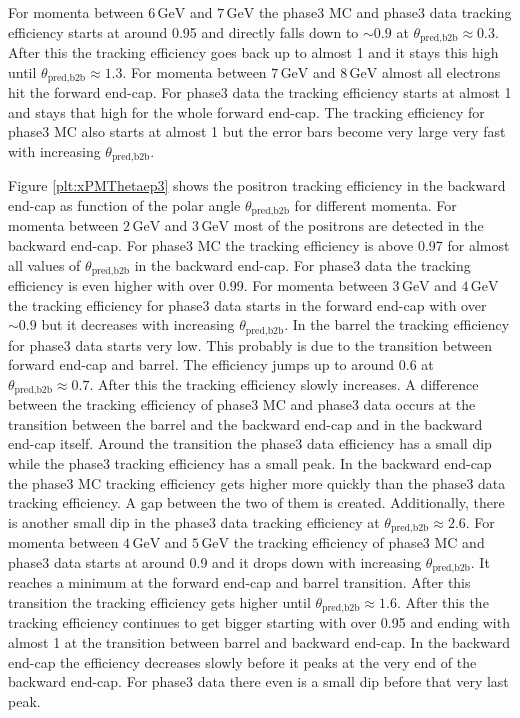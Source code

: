 \documentclass[a4paper,11pt,twosided,final,german,openbib,pdftex,listof=totoc,bibliography=totoc]{scrbook}
\begin{document}
For momenta between $6\,\textrm{GeV}$ and $7\,\textrm{GeV}$ the phase3 MC and phase3 data tracking efficiency starts at around 0.95 and directly falls down to $\sim 0.9$ at $\theta_{\textrm{pred,b2b}} \approx 0.3$. After this the tracking efficiency goes back up to almost 1 and it stays this high until $\theta_{\textrm{pred,b2b}} \approx 1.3$.
For momenta between $7\,\textrm{GeV}$ and $8\,\textrm{GeV}$ almost all electrons hit the forward end-cap. For phase3 data the tracking efficiency starts at almost 1 and stays that high for the whole forward end-cap. The tracking efficiency for phase3 MC also starts at almost 1 but the error bars become very large very fast with increasing $\theta_{\textrm{pred,b2b}}$.

Figure \ref{plt:xPMThetaep3} shows the positron tracking efficiency in the backward end-cap as function of the polar angle $\theta_{\textrm{pred,b2b}}$ for different momenta.
For momenta between $2\,\textrm{GeV}$ and $3\,\textrm{GeV}$ most of the positrons are detected in the backward end-cap. For phase3 MC the tracking efficiency is above 0.97 for almost all values of $\theta_{\textrm{pred,b2b}}$ in the backward end-cap. For phase3 data the tracking efficiency is even higher with over 0.99.
For momenta between $3\,\textrm{GeV}$ and $4\,\textrm{GeV}$ the tracking efficiency for phase3 data starts in the forward end-cap with over $\sim 0.9$ but it decreases with increasing $\theta_{\textrm{pred,b2b}}$. In the barrel the tracking efficiency for phase3 data starts very low. This probably is due to the transition between forward end-cap and barrel. The efficiency jumps up to around 0.6 at $\theta_{\textrm{pred,b2b}} \approx 0.7$. After this the tracking efficiency slowly increases. A difference between the tracking efficiency of phase3 MC and phase3 data occurs at the transition between the barrel and the backward end-cap and in the backward end-cap itself. Around the transition the phase3 data efficiency has a small dip while the phase3 tracking efficiency has a small peak. In the backward end-cap the phase3 MC tracking efficiency gets higher more quickly than the phase3 data tracking efficiency. A gap between the two of them is created. Additionally, there is another small dip in the phase3 data tracking efficiency at $\theta_{\textrm{pred,b2b}} \approx 2.6$. 
For momenta between $4\,\textrm{GeV}$ and $5\,\textrm{GeV}$ the tracking efficiency of phase3 MC and phase3 data starts at around 0.9 and it drops down with increasing $\theta_{\textrm{pred,b2b}}$. It reaches a minimum at the forward end-cap and barrel transition. After this transition the tracking efficiency gets higher until $\theta_{\textrm{pred,b2b}} \approx 1.6$. After this the tracking efficiency continues to get bigger starting with over 0.95 and ending with almost 1 at the transition between barrel and backward end-cap. In the backward end-cap the efficiency decreases slowly before it peaks at the very end of the backward end-cap. For phase3 data there even is a small dip before that very last peak.
\end{document}
